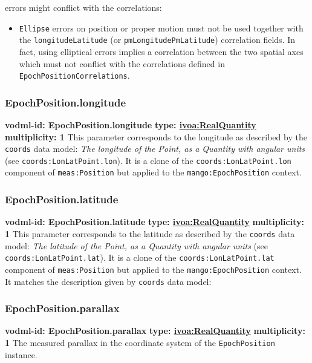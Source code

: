 errors might conflict with the correlations: \begin{itemize} \item \texttt{Ellipse} errors on position or proper motion must not be used together with the \texttt{longitudeLatitude} (or \texttt{pmLongitudePmLatitude}) correlation fields. In fact, using elliptical errors implies a correlation between the two spatial axes which must not conflict with the correlations defined in \texttt{EpochPositionCorrelations}. \end{itemize}

    \subsubsection{EpochPosition.longitude}
    \textbf{vodml-id: EpochPosition.longitude} \newline
    \textbf{type: \hyperref[sect:ivoa]{ivoa:RealQuantity}} \newline
    \textbf{multiplicity: 1} \newline
    This parameter corresponds to the longitude as described by the \texttt{coords} data model: \textit{The longitude of the Point, as a Quantity with angular units} (see \texttt{coords:LonLatPoint.lon}). It is a clone of the \texttt{coords:LonLatPoint.lon} component of \texttt{meas:Position} but applied to the \texttt{mango:EpochPosition} context.

    \subsubsection{EpochPosition.latitude}
    \textbf{vodml-id: EpochPosition.latitude} \newline
    \textbf{type: \hyperref[sect:ivoa]{ivoa:RealQuantity}} \newline
    \textbf{multiplicity: 1} \newline
    This parameter corresponds to the latitude as described by the \texttt{coords} data model: \textit{The latitude of the Point, as a Quantity with angular units} (see \texttt{coords:LonLatPoint.lat}). It is a clone of the \texttt{coords:LonLatPoint.lat} component of \texttt{meas:Position} but applied to the \texttt{mango:EpochPosition} context. It matches the description given by \texttt{coords} data model:

    \subsubsection{EpochPosition.parallax}
    \textbf{vodml-id: EpochPosition.parallax} \newline
    \textbf{type: \hyperref[sect:ivoa]{ivoa:RealQuantity}} \newline
    \textbf{multiplicity: 1} \newline
    The measured parallax in the coordinate system of the \texttt{EpochPosition} instance.

